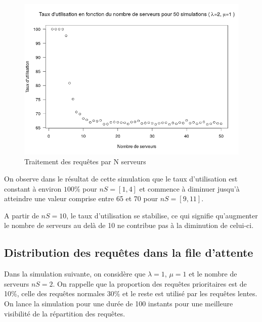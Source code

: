 \documentclass[12pt,a4paper]{article}
\begin{document}
    \begin{center}
        \begin{figure}[H]
            \includegraphics[scale=0.7]{busyRate.png}
            \caption{Traitement des requêtes par N serveurs}
        \end{figure}
    \end{center}

    On observe dans le résultat de cette simulation que le taux d'utilisation est constant à environ $100\%$ pour $nS = [{1},{4}]$ et commence à diminuer jusqu'à atteindre une valeur comprise entre 65 et 70 pour $nS = [{9},{11}]$.
    \newline
    \par A partir de $nS = 10$, le taux d'utilisation se stabilise, ce qui signifie qu'augmenter le nombre de serveurs au delà de 10 ne contribue pas à la diminution de celui-ci.

    \newpage
    \subsection{Distribution des requêtes dans la file d'attente}
    \par Dans la simulation suivante, on considère que $\lambda = 1$, $\mu = 1$ et le nombre de serveurs $nS = 2$. On rappelle que la proportion des requêtes prioritaires est de 10\%, celle des requêtes normales 30\% et le reste est utilisé par les requêtes lentes. \newline
    On lance la simulation pour une durée de 100 instants pour une meilleure visibilité de la répartition des requêtes.
    
\end{document}
